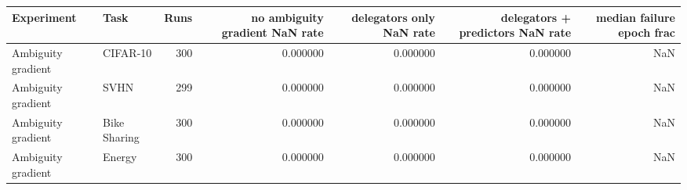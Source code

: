 \begin{tabular}{llrrrrr}
\toprule
Experiment & Task & Runs & no ambiguity gradient NaN rate & delegators only NaN rate & delegators + predictors NaN rate & median failure epoch frac \\
\midrule
Ambiguity gradient & CIFAR-10 & 300 & 0.000000 & 0.000000 & 0.000000 & NaN \\
Ambiguity gradient & SVHN & 299 & 0.000000 & 0.000000 & 0.000000 & NaN \\
Ambiguity gradient & Bike Sharing & 300 & 0.000000 & 0.000000 & 0.000000 & NaN \\
Ambiguity gradient & Energy & 300 & 0.000000 & 0.000000 & 0.000000 & NaN \\
\bottomrule
\end{tabular}

